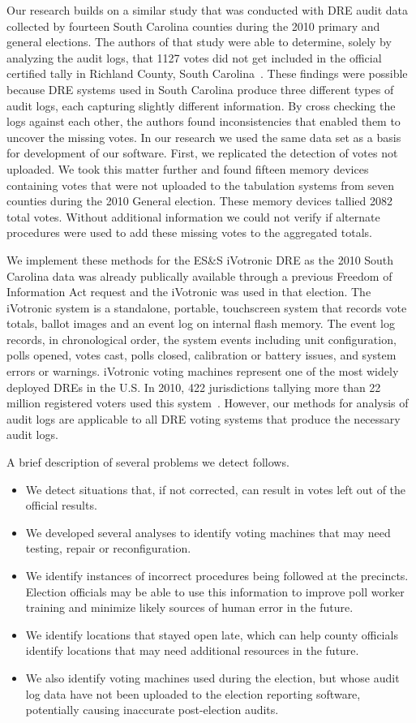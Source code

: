 Our research builds on a similar study that was conducted with DRE audit data collected by fourteen South Carolina counties during the 2010 primary and general elections.  The authors of that study were able to determine, solely by analyzing the audit logs, that 1127 votes did not get included in the official certified tally in Richland County, South Carolina~\cite{Buell2011}. These findings were possible because DRE systems used in South Carolina produce three different types of audit logs, each capturing slightly different information. By cross checking the logs against each other, the authors found inconsistencies that enabled them to uncover the missing votes. In our research we used the same data set as a basis for development of our software. First, we replicated the detection of votes not uploaded. We took this matter further and found fifteen memory devices containing votes that were not uploaded to the tabulation systems from seven counties during the 2010 General election. These memory devices tallied 2082 total votes. Without additional information we could not verify if alternate procedures were used to add these missing votes to the aggregated totals. 

We implement these methods for the ES\&S iVotronic DRE as the 2010 South
Carolina data was already publically available through a previous
Freedom of Information Act request and the iVotronic was used in that election.  The iVotronic system is a
standalone, portable, touchscreen system that records vote totals,
ballot images and an event log on internal flash 
memory. The event log records, in chronological order, the system
events including unit configuration, polls opened, votes cast, polls
closed, calibration or battery issues, and system errors or warnings. 
iVotronic voting machines represent one of the most widely deployed
DREs in the U.S. In 2010, 422 jurisdictions tallying more than 22
million registered voters used this system~\cite{VerVot2010}. However, our methods for analysis of audit logs
are applicable to all DRE voting systems  that produce the necessary
audit logs.  

A brief description of several problems we detect follows.
\smvertspace
\begin{itemize}
\item We detect situations that, if not corrected, can result in votes left out
of the official results.  
\item We developed several analyses to identify voting machines that may need
testing, repair or reconfiguration. 
\item We identify instances of incorrect procedures being followed at the
precincts. Election officials may be able to use this information to improve 
poll worker training and minimize likely sources of human error in the future. 
\item  We identify locations that stayed open late, which can help county
officials identify locations that may need additional resources in the future.  
\item We also identify voting machines used during the election, but whose audit log data 
have not been uploaded to the election reporting software, potentially causing
inaccurate post-election audits.  
\end{itemize}

